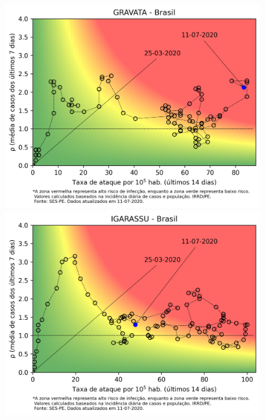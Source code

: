 \documentclass[]{article}
\begin{document}
\begin{figure}[!h]
\begin{minipage}[t]{4cm}
	\centering
	\includegraphics[scale=0.5]{../GRAVATA.png}
\end{minipage}
\hspace{5cm}
\begin{minipage}[t]{4cm}
	\centering
	\includegraphics[scale=0.5]{../IGARASSU.png}
	\vspace{0.2cm}
\end{minipage}


\end{figure}
\end{document}
